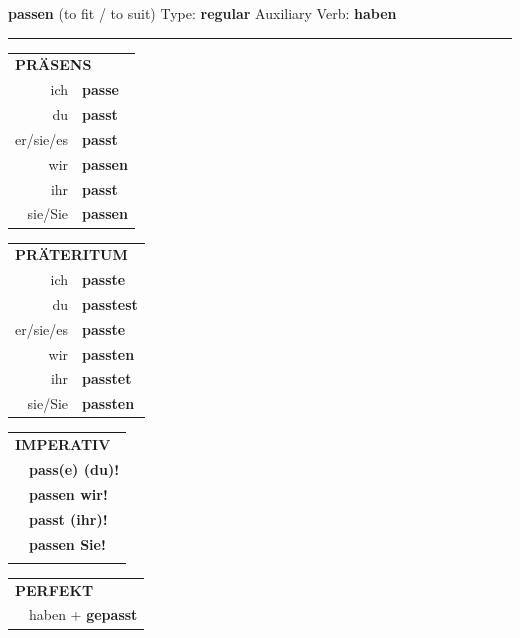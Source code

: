 \documentclass[10pt,a4paper]{revtex4-2}
\begin{document}
\begin{verbbox-dat}
    {\Large \bf passen} (to fit / to suit) \hfill Type: \textbf{regular} \hfill Auxiliary Verb: \textbf{haben} 
    
     \vspace{5pt}

    \hrule
    
    \vspace{5pt}

  \begin{tabular}{rl}
     \multicolumn{2}{l}{\textbf{PRÄSENS} }\\
    ich & \textbf{passe}\\
    du & \textbf{passt}\\
    er/sie/es & \textbf{passt}\\
    wir & \textbf{passen}\\
    ihr & \textbf{passt}\\
    sie/Sie & \textbf{passen}\\
  \end{tabular}
  \hfill
     \begin{tabular}{rl}
    \multicolumn{2}{l}{\textbf{PRÄTERITUM} }\\
    ich & \textbf{passte}\\
    du & \textbf{passtest}\\
    er/sie/es & \textbf{passte}\\
    wir & \textbf{passten}\\
    ihr & \textbf{passtet}\\
    sie/Sie & \textbf{passten}\\
  \end{tabular}
  \hfill
  \begin{tabular}{rl}
     \multicolumn{2}{l}{\textbf{IMPERATIV} }\\
   & \textbf{pass(e) (du)!}\\
   & \textbf{passen wir!}\\
   & \textbf{passt (ihr)!}\\
   & \textbf{passen Sie!}\\
   & \vspace{10pt}
  \end{tabular}

    \vspace{10pt}

 \begin{tabular}{rl}
     \multicolumn{2}{l}{\textbf{PERFEKT}}\\
   & haben + \textbf{gepasst}\\
  \end{tabular}
\hfill
   \begin{tabular}{rl}
   

\end{tabular}
\end{verbbox-dat}
\end{document}
